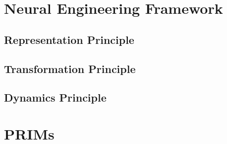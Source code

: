 \section{Neural Engineering Framework \label{sec:nef}}


\subsection{Representation Principle}
\subsection{Transformation Principle}
\subsection{Dynamics Principle}

\section{PRIMs}
